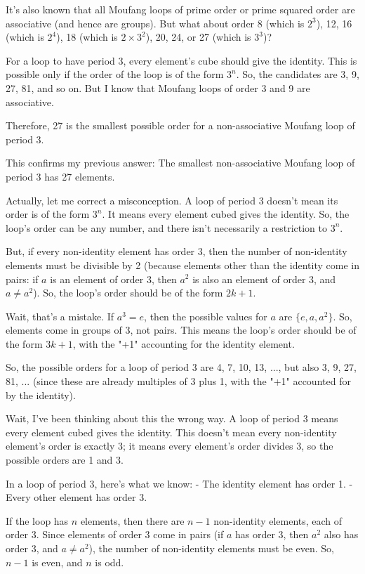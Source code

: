 \documentclass[12p]{article}
\newcounter{reasoningcounter}
\newenvironment{reasoning}[1][]
{\refstepcounter{reasoningcounter}%
\begin{tcolorbox}[
    title=Reasoning \thereasoningcounter: #1,
    colback=white, %
    colframe=gray,
    coltext=black, %
    fonttitle=\bfseries\normalsize,
    top=2mm,
    bottom=2mm,
    enlarge top initially by=5mm
]
\small
}
{\end{tcolorbox}}
\begin{document}
\begin{reasoning}
It's also known that all Moufang loops of prime order or prime squared order are associative (and hence are groups). But what about order 8 (which is $2^3$), 12, 16 (which is $2^4$), 18 (which is $2 \times 3^2$), 20, 24, or 27 (which is $3^3$)?

For a loop to have period 3, every element's cube should give the identity. This is possible only if the order of the loop is of the form $3^n$. So, the candidates are 3, 9, 27, 81, and so on. But I know that Moufang loops of order 3 and 9 are associative.

Therefore, 27 is the smallest possible order for a non-associative Moufang loop of period 3.

This confirms my previous answer: The smallest non-associative Moufang loop of period 3 has 27 elements.

Actually, let me correct a misconception. A loop of period 3 doesn't mean its order is of the form $3^n$. It means every element cubed gives the identity. So, the loop's order can be any number, and there isn't necessarily a restriction to $3^n$.

But, if every non-identity element has order 3, then the number of non-identity elements must be divisible by 2 (because elements other than the identity come in pairs: if $a$ is an element of order 3, then $a^2$ is also an element of order 3, and $a \neq a^2$). So, the loop's order should be of the form $2k + 1$.

Wait, that's a mistake. If $a^3 = e$, then the possible values for $a$ are $\{e, a, a^2\}$. So, elements come in groups of 3, not pairs. This means the loop's order should be of the form $3k + 1$, with the "+1" accounting for the identity element.

So, the possible orders for a loop of period 3 are 4, 7, 10, 13, ..., but also 3, 9, 27, 81, ... (since these are already multiples of 3 plus 1, with the "+1" accounted for by the identity).

Wait, I've been thinking about this the wrong way. A loop of period 3 means every element cubed gives the identity. This doesn't mean every non-identity element's order is exactly 3; it means every element's order divides 3, so the possible orders are 1 and 3.

In a loop of period 3, here's what we know:
- The identity element has order 1.
- Every other element has order 3.

If the loop has $n$ elements, then there are $n-1$ non-identity elements, each of order 3. Since elements of order 3 come in pairs (if $a$ has order 3, then $a^2$ also has order 3, and $a \neq a^2$), the number of non-identity elements must be even. So, $n-1$ is even, and $n$ is odd.


\end{reasoning}
\end{document}
